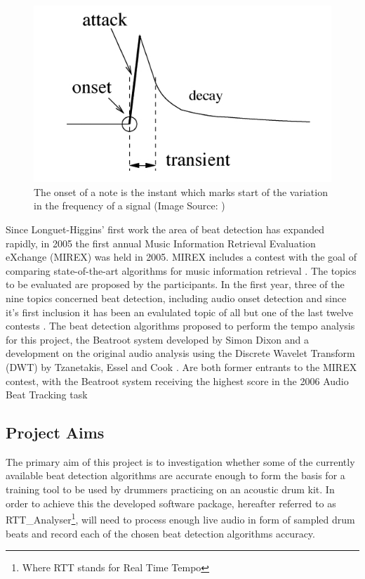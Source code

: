 \documentclass[a4paper, 11pt]{article}
\begin{document}
\begin{figure}[ht]
	\centering
	\includegraphics[scale=0.40]{Onset}
	\caption{The onset of a note is the instant which marks start of the variation in the frequency of a signal (Image Source: \cite{onset-tut})}
	\label{fig: Onset}
\end{figure}

Since Longuet-Higgins' first work the area of beat detection has expanded rapidly, in 2005 the first annual Music Information Retrieval Evaluation eXchange (MIREX) was held in 2005. MIREX includes a contest with the goal of comparing state-of-the-art algorithms for music information retrieval \cite{mirex-main}. The topics to be evaluated are proposed by the participants. In the first year, three of the nine topics concerned beat detection, including audio onset detection and since it's first inclusion it has been an evalulated topic of all but one of the last twelve contests \cite{mirex-onset}. The beat detection algorithms proposed to perform the tempo analysis for this project, the Beatroot system developed by Simon Dixon \cite{dixon1} and a development on the original audio analysis using the Discrete Wavelet Transform (DWT) by Tzanetakis, Essel and Cook \cite{tzane1}. Are both former entrants to the MIREX contest, with the Beatroot system receiving the highest score in the 2006 Audio Beat Tracking task \cite{mirex-06} 

\subsection{Project Aims}
The primary aim of this project is to investigation whether some of the currently available beat detection algorithms are accurate enough to form the basis for a training tool to be used by drummers practicing on an acoustic drum kit. In order to achieve this the developed software package, hereafter referred to as  RTT\_Analyser\footnote{Where RTT stands for Real Time Tempo}, will need to process enough live audio in form of sampled drum beats and record each of the chosen beat detection algorithms accuracy. 
\end{document}
